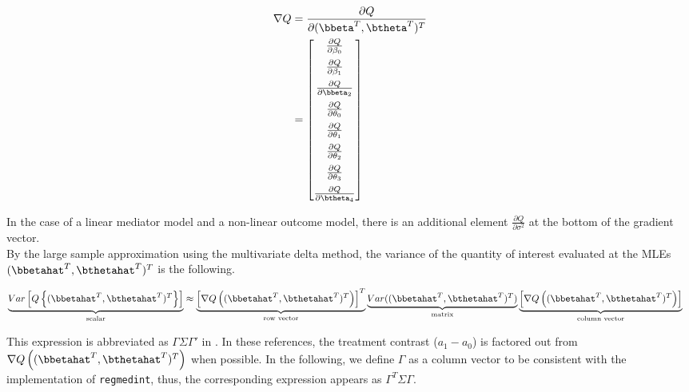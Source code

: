 \documentclass[10pt]{article}
\begin{document}
\begin{align*}
\nabla Q &= \frac{\partial Q}{\partial (\bbeta^{T},\btheta^{T})^{T}}\\
         &= \begin{bmatrix}
           \frac{\partial Q}{\partial \beta_{0}}\\[6pt]
           \frac{\partial Q}{\partial \beta_{1}}\\[6pt]
           \frac{\partial Q}{\partial \bbeta_{2}}\\[6pt]
           \frac{\partial Q}{\partial \theta_{0}}\\[6pt]
           \frac{\partial Q}{\partial \theta_{1}}\\[6pt]
           \frac{\partial Q}{\partial \theta_{2}}\\[6pt]
           \frac{\partial Q}{\partial \theta_{3}}\\[6pt]
           \frac{\partial Q}{\partial \btheta_{4}}\\
         \end{bmatrix}\\
\end{align*}

In the case of a linear mediator model and a non-linear outcome model, there is an additional element \(\frac{\partial Q}{\partial \sigma^{2}}\) at the bottom of the gradient vector.\\

By the large sample approximation using the multivariate delta method, the variance of the quantity of interest evaluated at the MLEs \((\bbetahat^{T},\bthetahat^{T})^{T}\) is the following.

\begin{align*}
  \underbrace{Var \left[ Q\left\{ (\bbetahat^{T},\bthetahat^{T})^{T} \right\} \right]}_{\text{scalar}}
  &\approx
  \underbrace{\left[ \nabla Q \left( (\bbetahat^{T},\bthetahat^{T})^{T} \right) \right]^{T}}_{\text{row vector}}
  \underbrace{Var((\bbetahat^{T},\bthetahat^{T})^{T})}_{\text{matrix}}
  \underbrace{\left[ \nabla Q \left( (\bbetahat^{T},\bthetahat^{T})^{T} \right) \right]}_{\text{column vector}}
\end{align*}

This expression is abbreviated as \(\Gamma\Sigma\Gamma'\) in \cite{vanderweeleExplanationCausalInference2015,valeriMediationAnalysisAllowing2013,valeriSASMacroCausal2015}. In these references, the treatment contrast (\(a_{1}-a_{0}\)) is factored out from \(\nabla Q \left( (\bbetahat^{T},\bthetahat^{T})^{T} \right)\) when possible. In the following, we define \(\Gamma\) as a column vector to be consistent with the implementation of \texttt{regmedint}, thus, the corresponding expression appears as \(\Gamma^{T}\Sigma\Gamma\).
\end{document}
